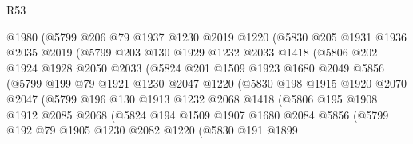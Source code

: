 \begin{lexlean}{R53}
\begin{coremodule}
                @1980
                (@5799
                  @206
                  @79
                  @1937
                  @1230
                  @2019
                  @1220
                  (@5830
                    @205
                    @1931
                    @1936
                    @2035
                    @2019
                    (@5799
                      @203
                      @130
                      @1929
                      @1232
                      @2033
                      @1418
                      (@5806
                        @202
                        @1924
                        @1928
                        @2050
                        @2033
                        (@5824
                          @201
                          @1509
                          @1923
                          @1680
                          @2049
                          @5856
                          (@5799
                            @199
                            @79
                            @1921
                            @1230
                            @2047
                            @1220
                            (@5830
                              @198
                              @1915
                              @1920
                              @2070
                              @2047
                              (@5799
                                @196
                                @130
                                @1913
                                @1232
                                @2068
                                @1418
                                (@5806
                                  @195
                                  @1908
                                  @1912
                                  @2085
                                  @2068
                                  (@5824
                                    @194
                                    @1509
                                    @1907
                                    @1680
                                    @2084
                                    @5856
                                    (@5799
                                      @192
                                      @79
                                      @1905
                                      @1230
                                      @2082
                                      @1220
                                      (@5830
                                        @191
                                        @1899

\end{coremodule}
\end{lexlean}
